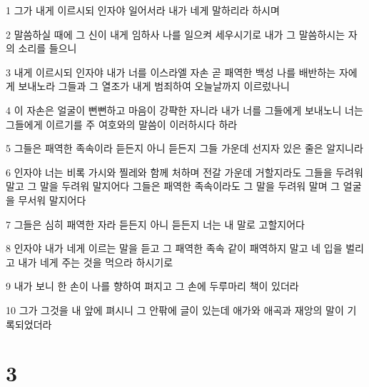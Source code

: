 \par 1 그가 내게 이르시되 인자야 일어서라 내가 네게 말하리라 하시며
\par 2 말씀하실 때에 그 신이 내게 임하사 나를 일으켜 세우시기로 내가 그 말씀하시는 자의 소리를 들으니
\par 3 내게 이르시되 인자야 내가 너를 이스라엘 자손 곧 패역한 백성 나를 배반하는 자에게 보내노라 그들과 그 열조가 내게 범죄하여 오늘날까지 이르렀나니
\par 4 이 자손은 얼굴이 뻔뻔하고 마음이 강퍅한 자니라 내가 너를 그들에게 보내노니 너는 그들에게 이르기를 주 여호와의 말씀이 이러하시다 하라
\par 5 그들은 패역한 족속이라 듣든지 아니 듣든지 그들 가운데 선지자 있은 줄은 알지니라
\par 6 인자야 너는 비록 가시와 찔레와 함께 처하며 전갈 가운데 거할지라도 그들을 두려워 말고 그 말을 두려워 말지어다 그들은 패역한 족속이라도 그 말을 두려워 말며 그 얼굴을 무서워 말지어다
\par 7 그들은 심히 패역한 자라 듣든지 아니 듣든지 너는 내 말로 고할지어다
\par 8 인자야 내가 네게 이르는 말을 듣고 그 패역한 족속 같이 패역하지 말고 네 입을 벌리고 내가 네게 주는 것을 먹으라 하시기로
\par 9 내가 보니 한 손이 나를 향하여 펴지고 그 손에 두루마리 책이 있더라
\par 10 그가 그것을 내 앞에 펴시니 그 안팎에 글이 있는데 애가와 애곡과 재앙의 말이 기록되었더라

\chapter{3}

